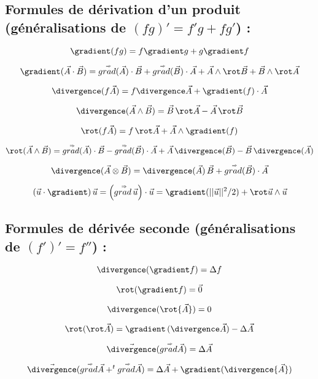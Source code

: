 \subsection{ Formules de dérivation d'un produit  (généralisations de $(fg)' = f'g + fg'$) :}


$$
\gradient ( fg) = f \gradient g + g \gradient f
$$

$$
\gradient ( \vec{A} \cdot \vec{B} ) = 
\mytensor{grad}( \vec{A} ) \cdot \vec{B}
+
\mytensor{grad}( \vec{B} ) \cdot \vec{A}
+
\vec{A} \wedge \rot \vec{B} +  \vec{B} \wedge \rot \vec{A}
$$

$$
\divergence(f \vec{A} ) = f \divergence \vec{A} + \gradient (f) \cdot \vec{A}
$$

$$
\divergence(\vec{A} \wedge \vec{B} ) = \vec{B} \, \rot  \vec{A} 
-\vec{A} \, \rot \vec{B}
$$

$$
\rot ( f \vec{A} ) = f \, \rot \vec{A} + \vec{A} \wedge \gradient (f)
$$

$$
\rot ( \vec{A}  \wedge \vec{B} ) = \mytensor{grad}( \vec{A} ) \cdot \vec{B}
-
\mytensor{grad}( \vec{B} ) \cdot \vec{A}
+
\vec{A} \, \divergence (\vec{B}) -  \vec{B} \, \divergence( \vec{A})
$$

$$
\divergence ( \vec{A} \otimes \vec{B} ) = \divergence (\vec{A}) \, \vec{B} 
+\mytensor{grad}( \vec{B} ) \cdot \vec{A}
 $$

$$
\left( \vec{u} \cdot \gradient \right)  \vec{u} 
= \left( \mytensor{grad} \, \vec{u} \right) \cdot \vec{u}
= \gradient ( ||\vec{u}||^2 /2 ) + \rot \vec{u} \wedge \vec{u}
$$ 




\subsection{Formules de dérivée seconde (généralisations de $(f')' = f''$) :}

$$
\divergence (\gradient  f) = \Delta f 
$$

$$
\rot (\gradient  f) = \vec{0} 
$$


$$
\divergence ( \rot {\vec A} ) = 0
$$

$$
 \rot (\rot \vec{A}  )  = \gradient \, (\divergence \vec{A})  - \Delta \vec{A}
$$


$$
\vec{\divergence} (\mytensor{grad}  \vec{A}) = \Delta  {\vec A}
$$

$$
\vec{\divergence} (\mytensor{grad}  \vec{A}+ ^t\mytensor{grad}  \vec{A}) = \Delta  {\vec A} + \gradient (\divergence{\vec{A}}) 
$$



